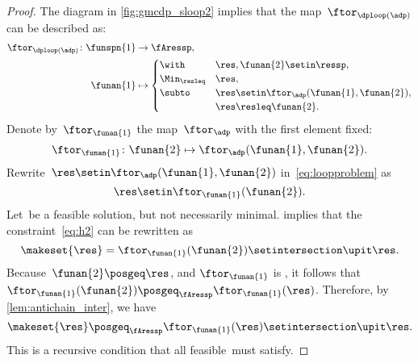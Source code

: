 \begin{proof}
    The diagram in \cref{fig:gmcdp_sloop2} implies that the map~$\ftor_{\dploop(\adp)}$ can be described as:
    \begin{align}
        \ftor_{\dploop(\adp)}\colon\funspn{1} & \to\fAressp,\label{eq:loopproblem} \\
        \funan{1}                             & \mapsto\begin{cases}
                                                           \with          & \res,\funan{2}\setin\ressp,                  \\
                                                           \Min_{\resleq} & \res,                                        \\
                                                           \subto         & \res\setin\ftor_{\adp}(\funan{1},\funan{2}), \\
                                                                          & \res\resleq\funan{2}.
                                                       \end{cases}
    \end{align}
    Denote by~$\ftor_{\funan{1}}$ the map~$\ftor_{\adp}$ with the first element fixed:
    \begin{equation}
        \ftor_{\funan{1}}\colon\funan{2}\mapsto\ftor_{\adp}(\funan{1},\funan{2}).
    \end{equation}
    Rewrite~$\res\setin\ftor_{\adp}(\funan{1},\funan{2})$ in~\cref{eq:loopproblem} as
    \begin{equation}
        \res\setin\ftor_{\funan{1}}(\funan{2}).
        \label{eq:h2}
    \end{equation}
    Let~\res be a feasible solution, but not necessarily minimal.
     implies that the constraint~\cref{eq:h2} can be rewritten as
    \begin{equation}
        \makeset{\res}=\ftor_{\funan{1}}(\funan{2})\setintersection\upit\res.
        \label{eq:h3}
    \end{equation}
    Because~$\funan{2}\posgeq\res$, and $\ftor_{\funan{1}}$ is , it follows that~$\ftor_{\funan{1}}(\funan{2})\posgeq_{\fAressp}\ftor_{\funan{1}}(\res)$.
    Therefore, by \cref{lem:antichain_inter}, we have
    \begin{equation}
        \makeset{\res}\posgeq_{\fAressp}\ftor_{\funan{1}}(\res)\setintersection\upit\res.
        \label{eq:fea}
    \end{equation}
    This is a recursive condition that all feasible~\res must satisfy.


\end{proof}
